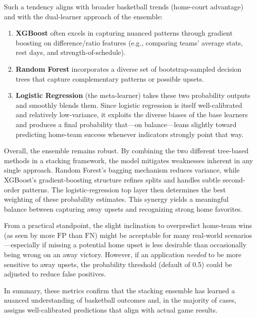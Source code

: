 \documentclass[12pt]{article}
\begin{document}
Such a tendency aligns with broader basketball trends (home-court advantage) and with the dual-learner approach of the ensemble:
\begin{enumerate}
    \item \textbf{XGBoost} often excels in capturing nuanced patterns through gradient boosting on difference/ratio features (e.g., comparing teams’ average stats, rest days, and strength-of-schedule). 
    \item \textbf{Random Forest} incorporates a diverse set of bootstrap-sampled decision trees that capture complementary patterns or possible upsets.
    \item \textbf{Logistic Regression} (the meta-learner) takes these two probability outputs and smoothly blends them. Since logistic regression is itself well-calibrated and relatively low-variance, it exploits the diverse biases of the base learners and produces a final probability that—on balance—leans slightly toward predicting home-team success whenever indicators strongly point that way.
\end{enumerate}

Overall, the ensemble remains robust. By combining the two different tree-based methods in a stacking framework, the model mitigates weaknesses inherent in any single approach. Random Forest’s bagging mechanism reduces variance, while XGBoost’s gradient-boosting structure refines splits and handles subtle second-order patterns. The logistic-regression top layer then determines the best weighting of these probability estimates. This synergy yields a meaningful balance between capturing away upsets and recognizing strong home favorites.

From a practical standpoint, the slight inclination to overpredict home-team wins (as seen by more \(\mathrm{FP}\) than \(\mathrm{FN}\)) might be acceptable for many real-world scenarios—especially if missing a potential home upset is less desirable than occasionally being wrong on an away victory. However, if an application \emph{needed} to be more sensitive to away upsets, the probability threshold (default of 0.5) could be adjusted to reduce false positives.

In summary, these metrics confirm that the stacking ensemble has learned a nuanced understanding of basketball outcomes and, in the majority of cases, assigns well-calibrated predictions that align with actual game results.
\end{document}
